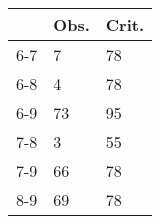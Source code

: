 \begin{table}[ht]
\centering
\begin{tabular}{rll}
  \hline
 & Obs. & Crit. \\ 
  \hline
6-7 & 7 & 78 \\ 
  6-8 & 4 & 78 \\ 
  6-9 & 73 & 95 \\ 
  7-8 & 3 & 55 \\ 
  7-9 & 66 & 78 \\ 
  8-9 & 69 & 78 \\ 
   \hline
\end{tabular}
\end{table}
